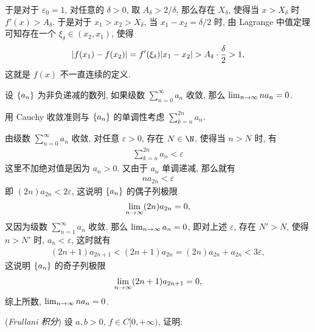 \begin{exercise}[series=exer]
\begin{answer}
    于是对于 $ \varepsilon_{0} = 1 $, 对任意的 $ \delta > 0 $, 取 $ A_{\delta} > 2/\delta $, 那么存在 $ X_{\delta} $, 使得当 $ x > X_{\delta} $ 时 $ f'(x) > A_{\delta} $. 于是对于 $ x_{1} > x_{2} > X_{\delta} $, 当 $ x_{1} - x_{2} = \delta/2 $ 时, 由 Lagrange 中值定理可知存在一个 $ \xi_{\delta} \in (x_{2}, x_{1}) $, 使得
    \begin{align*}
      \abs{f(x_{1}) - f(x_{2})} = f'(\xi_{\delta})\abs{x_{1} - x_{2}} > A_{\delta} \cdot \frac{\delta}{2} > 1,
    \end{align*}
    这就是 $ f(x) $ 不一直连续的定义.
  \end{answer}
  \item 设 $ \qty{a_{n}} $ 为非负递减的数列, 如果级数 $ \sum_{n=0}^{\infty}a_{n} $ 收敛, 那么 $ \lim_{n \to \infty} na_{n} = 0 $.
  \begin{hint}
      用 Cauchy 收敛准则与 $ \qty{a_{n}} $ 的单调性考虑 $ \sum_{k = n}^{2n} a_{n} $.
  \end{hint}
  \begin{answer}
    由级数 $ \sum_{n = 0}^{\infty} a_{n} $ 收敛, 对任意 $ \varepsilon > 0 $, 存在 $ N \in \N $, 使得当 $ n > N $ 时, 有
    \begin{align*}
      \sum_{k = n}^{2n} a_{n} < \varepsilon
    \end{align*}
    这里不加绝对值是因为 $ a_{n} > 0 $. 又由于 $ a_{n} $ 单调递减, 那么就有
    \begin{align*}
      na_{2n} < \varepsilon
    \end{align*}
    即 $ (2n)a_{2n} < 2\varepsilon $, 这说明 $ \qty{a_{n}} $ 的偶子列极限
    \begin{align*}
      \lim_{n \to \infty} (2n)a_{2n} = 0,
    \end{align*}
    又因为级数 $ \sum_{n = 1}^{\infty} a_{n} $ 收敛, 那么 $ \lim_{n \to \infty} a_{n} = 0 $, 即对上述 $ \varepsilon $, 存在 $ N' > N $, 使得 $ n > N' $ 时, $ a_{n} < \varepsilon $, 这时就有
    \begin{align*}
      (2n + 1)a_{2n + 1} < (2n + 1)a_{2n} = (2n)a_{2n} + a_{2n} < 3\varepsilon,
    \end{align*}
    这说明 $ \qty{a_{n}} $ 的奇子列极限
    \begin{align*}
      \lim_{n \to \infty} (2n + 1)a_{2n + 1} = 0,
    \end{align*}
    综上所数, $ \lim_{n \to \infty} na_{n} = 0 $.
  \end{answer}
  \item (\emph{Frullani 积分}) 设 $ a, b > 0 $, $ f \in C[0, +\infty) $, 证明:

\end{exercise}
